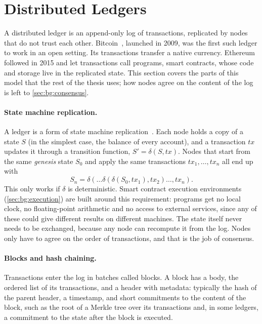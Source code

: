 \section{Distributed Ledgers}\label{sec:bg:ledgers}

A distributed ledger is an append-only log of transactions, replicated by nodes that do not trust each other.
Bitcoin~\cite{nakamoto2008bitcoin}, launched in 2009, was the first such ledger to work in an open setting.
Its transactions transfer a native currency.
Ethereum~\cite{wood2014ethereum} followed in 2015 and let transactions call programs, smart contracts, whose code and storage live in the replicated state.
This section covers the parts of this model that the rest of the thesis uses; how nodes agree on the content of the log is left to \autoref{sec:bg:consensus}.

\paragraph{State machine replication.}
A ledger is a form of state machine replication~\cite{schneider1990smr}.
Each node holds a copy of a state $S$ (in the simplest case, the balance of every account), and a transaction $tx$ updates it through a transition function, $S' = \delta(S, tx)$.
Nodes that start from the same \emph{genesis} state $S_0$ and apply the same transactions $tx_1, \ldots, tx_n$ all end up with
\[
	S_n = \delta(\ldots\delta(\delta(S_0, tx_1), tx_2)\ldots, tx_n).
\]
This only works if $\delta$ is deterministic.
Smart contract execution environments (\autoref{sec:bg:execution}) are built around this requirement: programs get no local clock, no floating-point arithmetic and no access to external services, since any of these could give different results on different machines.
The state itself never needs to be exchanged, because any node can recompute it from the log.
Nodes only have to agree on the order of transactions, and that is the job of consensus.

\paragraph{Blocks and hash chaining.}
Transactions enter the log in batches called blocks.
A block has a body, the ordered list of its transactions, and a header with metadata: typically the hash of the parent header, a timestamp, and short commitments to the content of the block, such as the root of a Merkle tree over its transactions and, in some ledgers, a commitment to the state after the block is executed.

